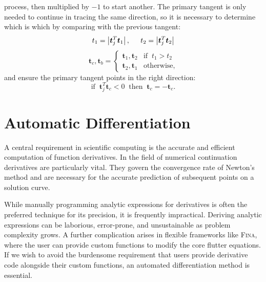 \documentclass[10pt,openany,twoside]{book}
\numberwithin{equation}{section}   %
\newcommand{\Fina}{{\normalfont\scshape Fina\:}}
\newcommand{\Vector}[1]{\boldsymbol{#1}}
\begin{document}
process, then multiplied by $-1$ to start another.
The primary tangent is only needed to continue in tracing the same direction,
so it is necessary to determine which is which by comparing with
the previous tangent:
\begin{equation*}
t_1 = \left| \Vector{t}_j^T \Vector{t}_1 \right|, \hspace{0.2in}
t_2 = \left| \Vector{t}_j^T \Vector{t}_2 \right| \nonumber
\end{equation*}
\begin{equation*}
	\Vector{t}_c, \Vector{t}_b = \begin{cases}
		\Vector{t}_1, \Vector{t}_2 & \text{if} \;\;  t_1 > t_2 \\
		\Vector{t}_2, \Vector{t}_1 & \text{otherwise},
	\end{cases}
\end{equation*}
and ensure the primary tangent points in the right direction:
\begin{equation*}
\text{if} \;\; \Vector{t}_j^T \Vector{t}_c < 0 \;\; \text{then} \;\; \Vector{t}_c = -\Vector{t}_c.
\end{equation*}

\chapter{Automatic Differentiation}\label{chap:AD}
\par
A central requirement in scientific computing is the accurate
and efficient computation of function derivatives. In the field
of numerical continuation derivatives are particularly vital. They govern
the convergence rate of Newton's method and are necessary for the
accurate prediction of subsequent points on a solution curve.

While manually programming analytic expressions for derivatives is
often the preferred technique for its precision, it is frequently
impractical. Deriving analytic expressions can be laborious, error-prone,
and unsustainable as problem complexity grows. A further complication
arises in flexible frameworks like \Fina, where the user can provide
custom functions to modify the core flutter equations. If we wish to avoid
the burdensome requirement that users provide derivative code alongside
their custom functions, an automated differentiation method is essential.
\end{document}
